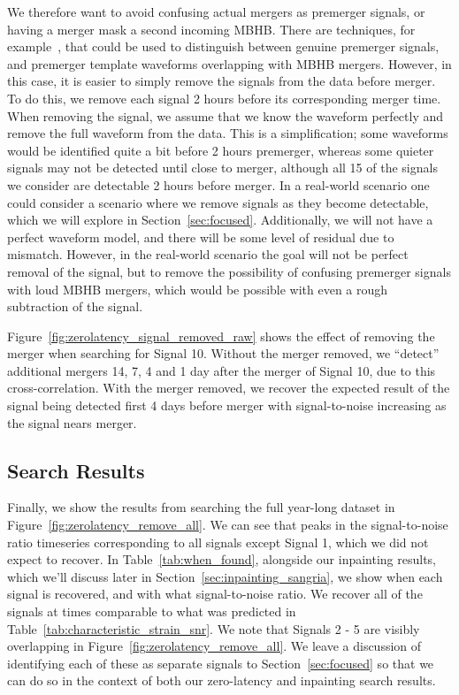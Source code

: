 \documentclass[%
 reprint,
superscriptaddress,
 nofootinbib,
 amsmath,amssymb,
 aps,
 prd,
]{revtex4-2}
\begin{document}
We therefore want to avoid confusing actual mergers as premerger signals, or having a merger mask a second incoming \ac{MBHB}.
There are techniques, for example~\cite{Allen:2004gu}, that could be used to distinguish between genuine premerger signals, and premerger template waveforms overlapping with \ac{MBHB} mergers.
However, in this case, it is easier to simply remove the signals from the data before merger.
To do this, we remove each signal 2 hours before its corresponding merger time.
When removing the signal, we assume that we know the waveform perfectly and remove the full waveform from the data. 
This is a simplification; some waveforms would be identified quite a bit before 2 hours premerger, whereas some quieter signals may not be detected until close to merger, although all 15 of the signals we consider are detectable 2 hours before merger.
In a real-world scenario one could consider a scenario where we remove signals as they become detectable, which we will explore in Section~\ref{sec:focused}.
Additionally, we will not have a perfect waveform model, and there will be some level of residual due to mismatch.
However, in the real-world scenario the goal will not be perfect removal of the signal, but to remove the possibility of confusing premerger signals with loud \ac{MBHB} mergers, which would be possible with even a rough subtraction of the signal.

Figure~\ref{fig:zerolatency_signal_removed_raw} shows the effect of removing the merger when searching for Signal 10.
Without the merger removed, we ``detect'' additional mergers 14, 7, 4 and 1 day after the merger of Signal 10, due to this cross-correlation.
With the merger removed, we recover the expected result of the signal being detected first 4 days before merger with signal-to-noise increasing as the signal nears merger.


\subsection{Search Results}
\label{subsec:zerolatency_results}

Finally, we show the results from searching the full year-long dataset in Figure~\ref{fig:zerolatency_remove_all}.
We can see that peaks in the signal-to-noise ratio timeseries corresponding to all signals except Signal 1, which we did not expect to recover.
In Table~\ref{tab:when_found}, alongside our inpainting results, which we'll discuss later in Section~\ref{sec:inpainting_sangria},
we show when each signal is recovered, and with what signal-to-noise ratio. We recover all of the signals at times comparable to what was predicted in Table~\ref{tab:characteristic_strain_snr}.
We note that Signals 2 - 5 are visibly overlapping in Figure~\ref{fig:zerolatency_remove_all}.
We leave a discussion of identifying each of these as separate signals to Section~\ref{sec:focused} so that we can do so in the context of both our zero-latency and inpainting search results.
\end{document}

